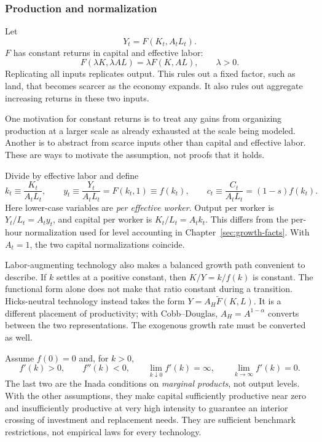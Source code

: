 \subsubsection{Production and normalization}

Let
\begin{equation}\label{eq:solow-production}
Y_t=F(K_t,A_tL_t).
\end{equation}
$F$ has constant returns in capital and effective labor:
\begin{equation}
F(\lambda K,\lambda AL)=\lambda F(K,AL),\qquad \lambda>0.
\end{equation}
Replicating all inputs replicates output. This rules out a fixed factor, such
as land, that becomes scarcer as the economy expands. It also rules out
aggregate increasing returns in these two inputs.

One motivation for constant returns is to treat any gains from organizing
production at a larger scale as already exhausted at the scale being modeled.
Another is to abstract from scarce inputs other than capital and effective
labor. These are ways to motivate the assumption, not proofs that it holds.

Divide by effective labor and define
\begin{equation}\label{eq:solow-normalization}
k_t\equiv\frac{K_t}{A_tL_t},\qquad
 y_t\equiv\frac{Y_t}{A_tL_t}=F(k_t,1)\equiv f(k_t),\qquad
 c_t\equiv\frac{C_t}{A_tL_t}=(1-s)f(k_t).
\end{equation}
Here lower-case variables are \emph{per effective worker}. Output per worker is
$Y_t/L_t=A_ty_t$, and capital per worker is $K_t/L_t=A_tk_t$. This differs from
the per-hour normalization used for level accounting in Chapter~\ref{sec:growth-facts}.
With $A_t=1$, the two capital normalizations coincide.

Labor-augmenting technology also makes a balanced growth path convenient to
describe. If $k$ settles at a positive constant, then
$K/Y=k/f(k)$ is constant. The functional form alone does not make that ratio
constant during a transition. Hicks-neutral technology instead takes the form
$Y=A_H\widetilde F(K,L)$. It is a different placement of productivity; with
Cobb--Douglas, $A_H=A^{1-\alpha}$ converts between the two representations.
The exogenous growth rate must be converted as well.

Assume $f(0)=0$ and, for $k>0$,
\begin{equation}
f'(k)>0,\qquad f''(k)<0,\qquad
\lim_{k\downarrow0}f'(k)=\infty,\qquad
\lim_{k\to\infty}f'(k)=0.
\end{equation}
The last two are the Inada conditions on \emph{marginal products}, not output
levels. With the other assumptions, they make capital sufficiently productive
near zero and insufficiently productive at very high intensity to guarantee
an interior crossing of investment and replacement needs. They are sufficient
benchmark restrictions, not empirical laws for every technology.

